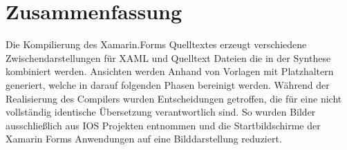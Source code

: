 \section{Zusammenfassung}
Die Kompilierung des Xamarin.Forms Quelltextes erzeugt verschiedene Zwischendarstellungen für XAML und Quelltext Dateien die in der Synthese kombiniert werden.   Ansichten werden Anhand von Vorlagen mit Platzhaltern generiert,  welche in darauf folgenden Phasen bereinigt werden.
Während der Realisierung des Compilers wurden Entscheidungen getroffen, die für eine nicht vollständig identische Übersetzung verantwortlich sind.  So wurden Bilder ausschließlich aus IOS Projekten entnommen und die Startbildschirme der Xamarin Forms Anwendungen auf eine Bilddarstellung reduziert.
